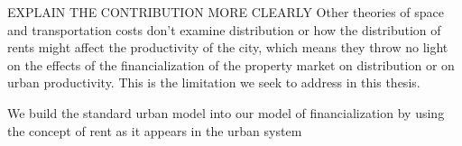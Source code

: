 














EXPLAIN THE CONTRIBUTION MORE CLEARLY
Other theories of space and transportation costs  don't examine distribution or how the distribution of rents might affect the productivity of the city, which means they throw no light on the effects of the financialization of the property market on distribution or on urban productivity.  This is the limitation we seek to address in this thesis. 

We build the  standard urban model into our model of financialization by using the concept of rent as it appears in the urban system


